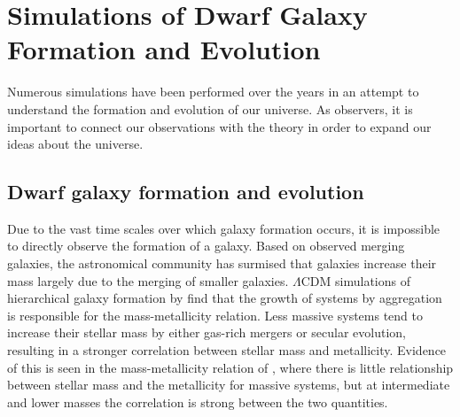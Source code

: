 \chapter[Simulations]{Simulations of Dwarf Galaxy Formation and Evolution}


Numerous simulations have been performed over the years in an attempt to 
understand the formation and evolution of our universe.  As observers, it is 
important to connect our observations with the theory in order to expand our 
ideas about the universe.


\section{Dwarf galaxy formation and evolution}

Due to the vast time scales over which galaxy formation occurs, it is impossible 
to directly observe the formation of a galaxy.  Based on observed merging 
galaxies, the astronomical community has surmised that galaxies increase their 
mass largely due to the merging of smaller galaxies.  $\Lambda$CDM simulations 
of hierarchical galaxy formation by \cite{deRossi07} find that the growth of 
systems by aggregation is responsible for the mass-metallicity relation.  Less 
massive systems tend to increase their stellar mass by either gas-rich mergers 
or secular evolution, resulting in a stronger correlation between stellar mass 
and metallicity.  Evidence of this is seen in the mass-metallicity relation of 
\cite{Tremonti04}, where there is little relationship between stellar mass and 
the metallicity for massive systems, but at intermediate and lower masses the 
correlation is strong between the two quantities.

